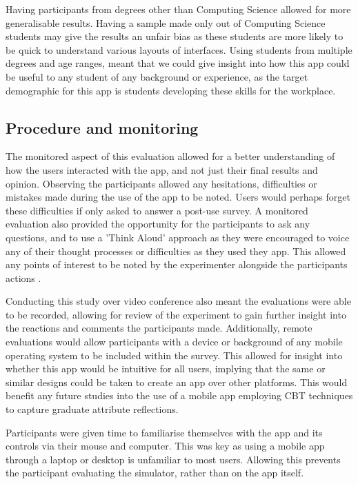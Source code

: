 \documentclass{l4proj}
\begin{document}
Having participants from degrees other than Computing Science allowed for more generalisable results. Having a sample made only out of Computing Science students may give the results an unfair bias as these students are more likely to be quick to understand various layouts of interfaces. Using students from multiple degrees and age ranges, meant that we could give insight into how this app could be useful to any student of any background or experience, as the target demographic for this app is students developing these skills for the workplace.

\subsection{Procedure and monitoring}

The monitored aspect of this evaluation allowed for a better understanding of how the users interacted with the app, and not just their final results and opinion. Observing the participants allowed any hesitations, difficulties or mistakes made during the use of the app to be noted. Users would perhaps forget these difficulties if only asked to answer a post-use survey. A monitored evaluation also provided the opportunity for the participants to ask any questions, and to use a 'Think Aloud' approach as they were encouraged to voice any of their thought processes or difficulties as they used they app. This allowed any points of interest to be noted by the experimenter alongside the participants actions \citep{lewis_task-centered_1994}.

Conducting this study over video conference also meant the evaluations were able to be recorded, allowing for review of the experiment to gain further insight into the reactions and comments the participants made. Additionally, remote evaluations would allow participants with a device or background of any mobile operating system to be included within the survey. This allowed for insight into whether this app would be intuitive for all users, implying that the same or similar designs could be taken to create an app over other platforms. This would benefit any future studies into the use of a mobile app employing CBT techniques to capture graduate attribute reflections. 
 
Participants were given time to familiarise themselves with the app and its controls via their mouse and computer. This was key as using a mobile app through a laptop or desktop is unfamiliar to most users. Allowing this prevents the participant evaluating the simulator, rather than on the app itself. 
 
\end{document}
